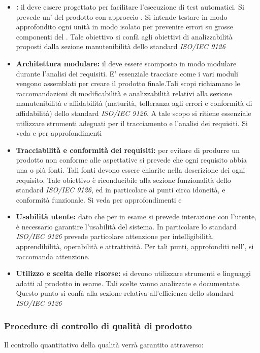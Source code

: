 \documentclass[12pt,a4paper]{article}
\begin{document}
\begin{itemize}
	\item \textbf{:} il  deve essere progettato per facilitare l'esecuzione di test automatici. Si prevede un'  del prodotto con approccio . Si intende testare in modo approfondito ogni unità  in modo isolato per prevenire errori su grosse componenti del . Tale obiettivo si confà agli obiettivi di analizzabilità proposti dalla sezione manutenibilità dello standard \textit{ISO/IEC 9126}
	\item \textbf{Architettura modulare:} il  deve essere scomposto in modo modulare durante l'analisi dei requisiti. E' essenziale tracciare come i vari moduli vengono assemblati per creare il prodotto finale.Tali scopi richiamano le raccomandazioni di modificabilità e analizzabilità relativi alla sezione manutenibilità e affidabilità (maturità, tolleranza agli errori e conformità di affidabilità) dello standard \textit{ISO/IEC 9126}. A tale scopo si ritiene essenziale utilizzare strumenti adeguati per il tracciamento e l'analisi dei requisiti. Si veda \NdP{} e \AdR{} per approfondimenti
	\item \textbf{Tracciabilità e conformità dei requisiti:} per evitare di produrre un prodotto non conforme alle aspettative si prevede che ogni requisito  abbia una o più fonti. Tali fonti devono essere chiarite nella descrizione dei ogni requisito. Tale obiettivo è riconducibile alla sezione funzionalità dello standard \textit{ISO/IEC 9126}, ed in particolare ai punti circa idoneità, e conformità funzionale. Si veda per approfondimenti \NdP{} e \AdR{}
	\item \textbf{Usabilità utente:} dato che per  in esame si prevede interazione con l'utente, è necessario garantire l'usabilità del sistema. In particolare lo standard \textit{ISO/IEC 9126} prevede particolare attenzione per intelligibilità, apprendibilità, operabilità e attrattività. Per tali punti, approfonditi nell'\FAD, si raccomanda attenzione.
	\item \textbf{Utilizzo e scelta delle risorse:} si devono utilizzare strumenti e linguaggi adatti al prodotto in esame. Tali scelte vanno analizzate e documentate. Questo punto si confà alla sezione relativa all'efficienza dello standard \textit{ISO/IEC 9126}
\end{itemize}

\subsubsection{Procedure di controllo di qualità di prodotto}
\label{sec:procedure-di-controllo-di-qualità-di-prodotto}
Il controllo quantitativo della qualità verrà garantito attraverso:
\end{document}
